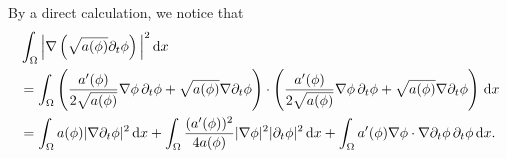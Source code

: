 \documentclass[11pt,reqno]{amsart}
\theoremstyle{remark}
\def\d{{\rm d}}
\def\uu{\boldsymbol{u}}
\numberwithin{equation}{section}
\def\d{{\rm d}}
\begin{document}
By a direct calculation, we notice that
\begin{align*}
 &\int_\Omega  \Big| \nabla \left( \sqrt{a(\phi)}\partial_t \phi \right) \Big|^2 \, \d x
 \\
 & = \int_\Omega \left( \frac{a'(\phi)}{2\sqrt{a(\phi)}}  \nabla \phi \, \partial_t \phi +
 \sqrt{a(\phi)} \nabla \partial_t \phi\right) \cdot  \left( \frac{a'(\phi)}{2\sqrt{a(\phi)}}  \nabla \phi \, \partial_t \phi +
 \sqrt{a(\phi)} \nabla \partial_t \phi \right)  \, \d x
 \\
 & = \int_\Omega a(\phi) |\nabla \partial_t \phi|^2 \, \d x +
 \int_\Omega \frac{(a'(\phi))^2}{4 a(\phi)} |\nabla \phi|^2 |\partial_t \phi|^2 \, \d x
 + \int_\Omega a'(\phi) \nabla \phi \cdot \nabla \partial_t \phi \, \partial_t \phi \, \d x.
\end{align*}
\end{document}
